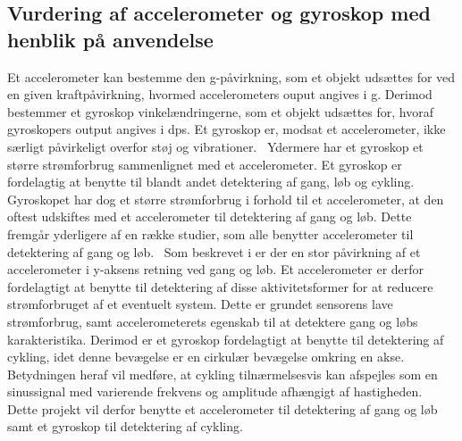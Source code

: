 \subsection{Vurdering af accelerometer og gyroskop med henblik på anvendelse}\label{acc_og_gyro}
Et accelerometer kan bestemme den g-påvirkning, som et objekt udsættes for ved en given kraftpåvirkning, hvormed accelerometers ouput angives i g. Derimod bestemmer et gyroskop vinkelændringerne, som et objekt udsættes for, hvoraf gyroskopers output angives i dps. Et gyroskop er, modsat et accelerometer, ikke særligt påvirkeligt overfor støj og vibrationer.~\citep{Goodrich2013,TittertonWeston2004,LuingeVeltink2005} Ydermere har et gyroskop et større strømforbrug sammenlignet med et accelerometer. Et gyroskop er fordelagtig at benytte til blandt andet detektering af gang, løb og cykling. Gyroskopet har dog et større strømforbrug i forhold til et accelerometer, at den oftest udskiftes med et accelerometer til detektering af gang og løb. Dette fremgår yderligere af en række studier, som alle benytter accelerometer til detektering af gang og løb.~\citep{Sparkfun,Rueterbories2010,ClelandKikhia2013} \newline
Som beskrevet i  er der en stor påvirkning af et accelerometer i y-aksens retning ved gang og løb. Et accelerometer er derfor fordelagtigt at benytte til detektering af disse aktivitetsformer for at reducere strømforbruget af et eventuelt system. Dette er grundet sensorens lave strømforbrug, samt accelerometerets egenskab til at detektere gang og løbs karakteristika. Derimod er et gyroskop fordelagtigt at benytte til detektering af cykling, idet denne bevægelse er en cirkulær bevægelse omkring en akse. Betydningen heraf vil medføre, at cykling tilnærmelsesvis kan afspejles som en sinussignal med varierende frekvens og amplitude afhængigt af hastigheden.~\citep{TittertonWeston2004,LuingeVeltink2005} \newline
Dette projekt vil derfor benytte et accelerometer til detektering af gang og løb samt et gyroskop til detektering af cykling.